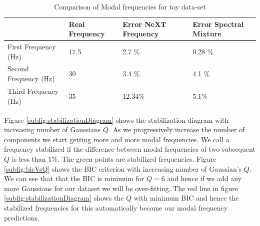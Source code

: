\renewcommand{\arraystretch}{1}
\begin{table}[!ht]
    \centering
\begin{tabular}{|l|l|l|l|}
  \hline
   & Real Frequency & Error NeXT Frequency & Error Spectral Mixture\\
  \hline 
  \hline
First Frequency (Hz) & 17.5 & 2.7 \% & 0.28 \%\\
Second Frequency (Hz)  & 30 & 3.4 \% & 4.1 \%\\
Third Frequency (Hz) & 35 & 12.34\% & 5.1\%\\
   \hline
\end{tabular}
\caption{Comparison of Modal frequencies for toy data-set}
  \label{tabComparisonOfModalFrequenciesToyData}
\end{table}

Figure \ref{subfig:stabilizationDiagram} shows the stabilization diagram with increasing number of Gaussians $Q$. As we progressively increase the number of components we start getting more and more modal frequencies. We call a frequency stabilized if the difference between modal frequencies of two subsequent $Q$ is less than $1\%$. The green points are stabilized frequencies. Figure \ref{subfig:bicVsQ} shows the BIC criterion with increasing number of Gaussian's $Q$. We can see that that the BIC is minimum for $Q=6$ and hence if we add any more Gaussians for our dataset we will be over-fitting. The red line in figure \ref{subfig:stabilizationDiagram} shows the $Q$ with minimum BIC and hence the stabilized frequencies for this automatically become our modal frequency predictions.

